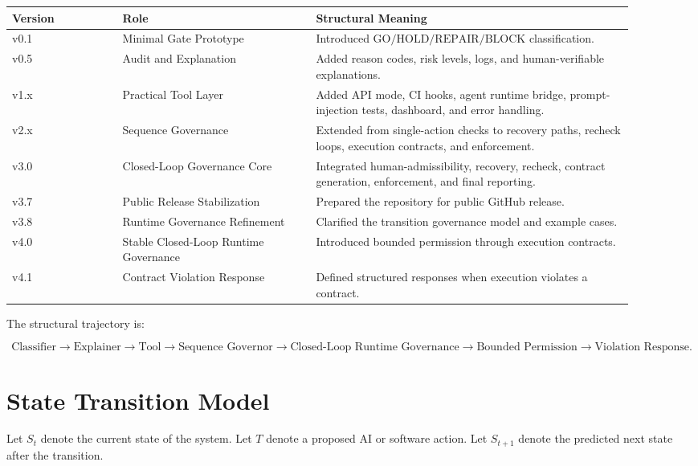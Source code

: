 \documentclass[11pt,a4paper]{article}
\newcommand{\GO}{\mathrm{GO}}
\newcommand{\HOLD}{\mathrm{HOLD}}
\newcommand{\REPAIR}{\mathrm{REPAIR}}
\newcommand{\BLOCK}{\mathrm{BLOCK}}
\begin{document}
\begin{longtable}{p{0.16\linewidth} p{0.28\linewidth} p{0.46\linewidth}}
\toprule
\textbf{Version} & \textbf{Role} & \textbf{Structural Meaning} \\
\midrule
v0.1 & Minimal Gate Prototype & Introduced \(\GO / \HOLD / \REPAIR / \BLOCK\) classification. \\
v0.5 & Audit and Explanation & Added reason codes, risk levels, logs, and human-verifiable explanations. \\
v1.x & Practical Tool Layer & Added API mode, CI hooks, agent runtime bridge, prompt-injection tests, dashboard, and error handling. \\
v2.x & Sequence Governance & Extended from single-action checks to recovery paths, recheck loops, execution contracts, and enforcement. \\
v3.0 & Closed-Loop Governance Core & Integrated human-admissibility, recovery, recheck, contract generation, enforcement, and final reporting. \\
v3.7 & Public Release Stabilization & Prepared the repository for public GitHub release. \\
v3.8 & Runtime Governance Refinement & Clarified the transition governance model and example cases. \\
v4.0 & Stable Closed-Loop Runtime Governance & Introduced bounded permission through execution contracts. \\
v4.1 & Contract Violation Response & Defined structured responses when execution violates a contract. \\
\bottomrule
\end{longtable}

The structural trajectory is:

\[
\text{Classifier}
\rightarrow
\text{Explainer}
\rightarrow
\text{Tool}
\rightarrow
\text{Sequence Governor}
\rightarrow
\text{Closed-Loop Runtime Governance}
\rightarrow
\text{Bounded Permission}
\rightarrow
\text{Violation Response}.
\]

\section{State Transition Model}

Let \(S_t\) denote the current state of the system.
Let \(T\) denote a proposed AI or software action.
Let \(S_{t+1}\) denote the predicted next state after the transition.
\end{document}
